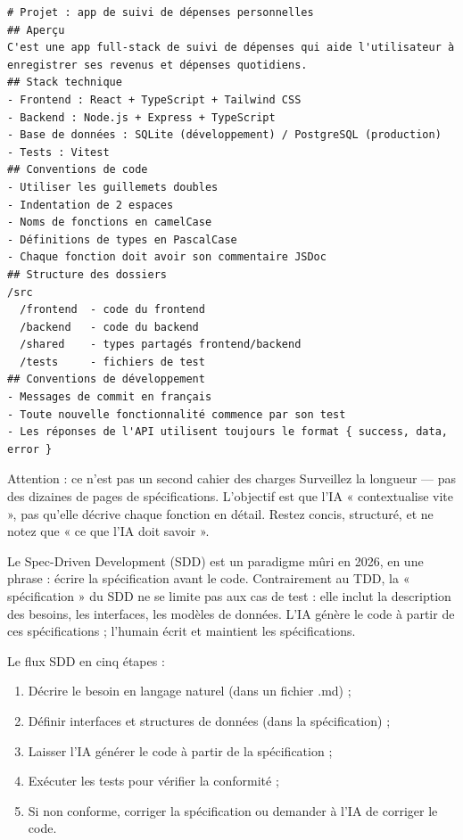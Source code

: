 \begin{lstlisting}
# Projet : app de suivi de dépenses personnelles
## Aperçu
C'est une app full-stack de suivi de dépenses qui aide l'utilisateur à enregistrer ses revenus et dépenses quotidiens.
## Stack technique
- Frontend : React + TypeScript + Tailwind CSS
- Backend : Node.js + Express + TypeScript
- Base de données : SQLite (développement) / PostgreSQL (production)
- Tests : Vitest
## Conventions de code
- Utiliser les guillemets doubles
- Indentation de 2 espaces
- Noms de fonctions en camelCase
- Définitions de types en PascalCase
- Chaque fonction doit avoir son commentaire JSDoc
## Structure des dossiers
/src
  /frontend  - code du frontend
  /backend   - code du backend
  /shared    - types partagés frontend/backend
  /tests     - fichiers de test
## Conventions de développement
- Messages de commit en français
- Toute nouvelle fonctionnalité commence par son test
- Les réponses de l'API utilisent toujours le format { success, data, error }
\end{lstlisting}

\begin{tcbwarn}{Attention : ce n'est pas un second cahier des charges}
Surveillez la longueur — pas des dizaines de pages de spécifications. L'objectif est que l'IA « contextualise vite », pas qu'elle décrive chaque fonction en détail. Restez concis, structuré, et ne notez que « ce que l'IA doit savoir ».

\end{tcbwarn}


Le Spec-Driven Development (SDD) est un paradigme mûri en 2026, en une phrase : écrire la spécification avant le code. Contrairement au TDD, la « spécification » du SDD ne se limite pas aux cas de test : elle inclut la description des besoins, les interfaces, les modèles de données. L'IA génère le code à partir de ces spécifications ; l'humain écrit et maintient les spécifications.

Le flux SDD en cinq étapes :

\begin{enumerate}
  \item Décrire le besoin en langage naturel (dans un fichier .md) ;
  \item Définir interfaces et structures de données (dans la spécification) ;
  \item Laisser l'IA générer le code à partir de la spécification ;
  \item Exécuter les tests pour vérifier la conformité ;
  \item Si non conforme, corriger la spécification ou demander à l'IA de corriger le code.
\end{enumerate}

